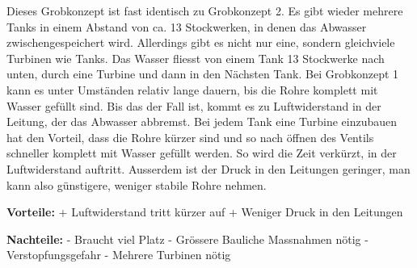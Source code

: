 Dieses Grobkonzept ist fast identisch zu Grobkonzept 2. Es gibt wieder mehrere Tanks in einem Abstand von ca. 13 Stockwerken, in denen das Abwasser zwischengespeichert wird. Allerdings gibt es nicht nur eine, sondern gleichviele Turbinen wie Tanks. Das Wasser fliesst von einem Tank 13 Stockwerke nach unten, durch eine Turbine und dann in den Nächsten Tank. Bei Grobkonzept 1 kann es unter Umständen relativ lange dauern, bis die Rohre komplett mit Wasser gefüllt sind. Bis das der Fall ist, kommt es zu Luftwiderstand in der Leitung, der das Abwasser abbremst. Bei jedem Tank eine Turbine einzubauen hat den Vorteil, dass die Rohre kürzer sind und so nach öffnen des Ventils schneller komplett mit Wasser gefüllt werden. So wird die Zeit verkürzt, in der Luftwiderstand auftritt. Ausserdem ist der Druck in den Leitungen geringer, man kann also günstigere, weniger stabile Rohre nehmen. 

\textbf{Vorteile:} 									\newline
+	Luftwiderstand tritt kürzer auf 				\newline
+	Weniger Druck in den Leitungen					\newline

\textbf{Nachteile:}									\newline
-	Braucht viel Platz								\newline
-	Grössere Bauliche Massnahmen nötig				\newline
-	Verstopfungsgefahr								\newline
-	Mehrere Turbinen nötig				
\newpage